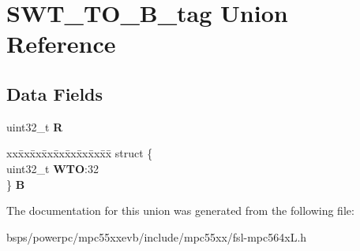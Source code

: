 \hypertarget{unionSWT__TO__32B__tag}{}\section{S\+W\+T\+\_\+\+T\+O\+\_\+B\+\_\+tag Union Reference}
\label{unionSWT__TO__32B__tag}
\subsection*{Data Fields}
\begin{DoxyCompactItemize}
\item 
\mbox{\label{unionSWT__TO__32B__tag_a153e122274e8edbc94ff036b529c531f}} 
uint32\+\_\+t {\bfseries R}
\item 
\mbox{\label{unionSWT__TO__32B__tag_a8a6a36d5d16febf6e72934fcb1210cb7}} 
\begin{tabbing}
xx\=xx\=xx\=xx\=xx\=xx\=xx\=xx\=xx\=\kill
struct \{\\
\>uint32\_t {\bfseries WTO}:32\\
\} {\bfseries B}\\

\end{tabbing}\end{DoxyCompactItemize}


The documentation for this union was generated from the following file\+:\begin{DoxyCompactItemize}
\item 
bsps/powerpc/mpc55xxevb/include/mpc55xx/fsl-\/mpc564x\+L.\+h\end{DoxyCompactItemize}
